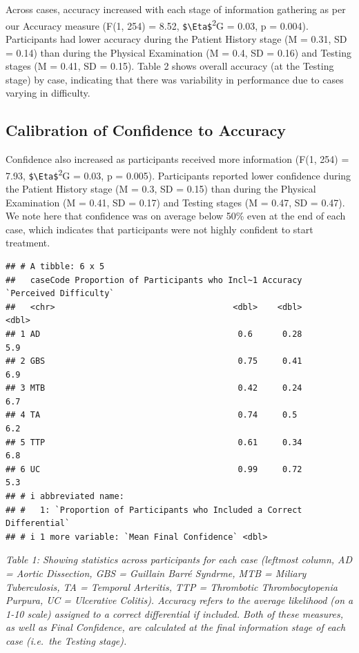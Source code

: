 \documentclass[a4paper, nobind]{templates/ociamthesis}
\begin{document}
Across cases, accuracy increased with each stage of information gathering as per our Accuracy measure (F(1, 254) = 8.52, \texttt{\$\textbackslash{}Eta\$}\textsuperscript{2}G = 0.03, p = 0.004). Participants had lower accuracy during the Patient History stage (M = 0.31, SD = 0.14) than during the Physical Examination (M = 0.4, SD = 0.16) and Testing stages (M = 0.41, SD = 0.15). Table 2 shows overall accuracy (at the Testing stage) by case, indicating that there was variability in performance due to cases varying in difficulty.

\subsection*{Calibration of Confidence to Accuracy}\label{calibration-of-confidence-to-accuracy}

Confidence also increased as participants received more information (F(1, 254) = 7.93, \texttt{\$\textbackslash{}Eta\$}\textsuperscript{2}G = 0.03, p = 0.005). Participants reported lower confidence during the Patient History stage (M = 0.3, SD = 0.15) than during the Physical Examination (M = 0.41, SD = 0.17) and Testing stages (M = 0.47, SD = 0.47). We note here that confidence was on average below 50\% even at the end of each case, which indicates that participants were not highly confident to start treatment.

\begin{verbatim}
## # A tibble: 6 x 5
##   caseCode Proportion of Participants who Incl~1 Accuracy `Perceived Difficulty`
##   <chr>                                    <dbl>    <dbl>                  <dbl>
## 1 AD                                        0.6      0.28                    5.9
## 2 GBS                                       0.75     0.41                    6.9
## 3 MTB                                       0.42     0.24                    6.7
## 4 TA                                        0.74     0.5                     6.2
## 5 TTP                                       0.61     0.34                    6.8
## 6 UC                                        0.99     0.72                    5.3
## # i abbreviated name:
## #   1: `Proportion of Participants who Included a Correct Differential`
## # i 1 more variable: `Mean Final Confidence` <dbl>
\end{verbatim}

\emph{Table 1: Showing statistics across participants for each case (leftmost column, AD = Aortic Dissection, GBS = Guillain Barré Syndrme, MTB = Miliary Tuberculosis, TA = Temporal Arteritis, TTP = Thrombotic Thrombocytopenia Purpura, UC = Ulcerative Colitis). Accuracy refers to the average likelihood (on a 1-10 scale) assigned to a correct differential if included. Both of these measures, as well as Final Confidence, are calculated at the final information stage of each case (i.e.~the Testing stage).}
\end{document}
